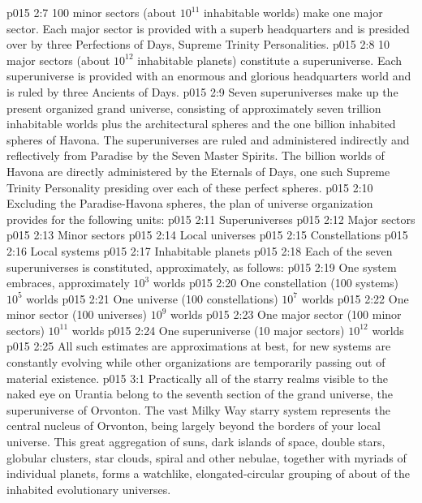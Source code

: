 \vs p015 2:7 \bibnobreakspace {} 100 minor sectors (about $10^{11}$ inhabitable worlds) make one major sector. Each major sector is provided with a superb headquarters and is presided over by three Perfections of Days, Supreme Trinity Personalities.
\vs p015 2:8 \bibnobreakspace {} 10 major sectors (about $10^{12}$ inhabitable planets) constitute a superuniverse. Each superuniverse is provided with an enormous and glorious headquarters world and is ruled by three Ancients of Days.
\vs p015 2:9 \bibnobreakspace {} Seven superuniverses make up the present organized grand universe, consisting of approximately seven trillion inhabitable worlds plus the architectural spheres and the one billion inhabited spheres of Havona. The superuniverses are ruled and administered indirectly and reflectively from Paradise by the Seven Master Spirits. The billion worlds of Havona are directly administered by the Eternals of Days, one such Supreme Trinity Personality presiding over each of these perfect spheres.
\vs p015 2:10 \pc Excluding the Paradise\hyp{}Havona spheres, the plan of universe organization provides for the following units:
\vs p015 2:11 Superuniverses\bibdf{}
\vs p015 2:12 Major sectors\bibdf{}
\vs p015 2:13 Minor sectors\bibdf{}
\vs p015 2:14 Local universes\bibdf{}
\vs p015 2:15 Constellations\bibdf{}
\vs p015 2:16 Local systems\bibdf{}
\vs p015 2:17 Inhabitable planets\bibdf{}
\vs p015 2:18 Each of the seven superuniverses is constituted, approximately, as follows:
\vs p015 2:19 One system embraces, approximately $10^3$ worlds
\vs p015 2:20 One constellation (100 systems) $10^5$ worlds
\vs p015 2:21 One universe (100 constellations) $10^7$ worlds
\vs p015 2:22 One minor sector (100 universes) $10^9$ worlds
\vs p015 2:23 One major sector (100 minor sectors) $10^{11}$ worlds
\vs p015 2:24 One superuniverse (10 major sectors) $10^{12}$ worlds
\vs p015 2:25 \pc All such estimates are approximations at best, for new systems are constantly evolving while other organizations are temporarily passing out of material existence.
\vs p015 3:1 Practically all of the starry realms visible to the naked eye on Urantia belong to the seventh section of the grand universe, the superuniverse of Orvonton. The vast Milky Way starry system represents the central nucleus of Orvonton, being largely beyond the borders of your local universe. This great aggregation of suns, dark islands of space, double stars, globular clusters, star clouds, spiral and other nebulae, together with myriads of individual planets, forms a watchlike, elongated\hyp{}circular grouping of about  of the inhabited evolutionary universes.
